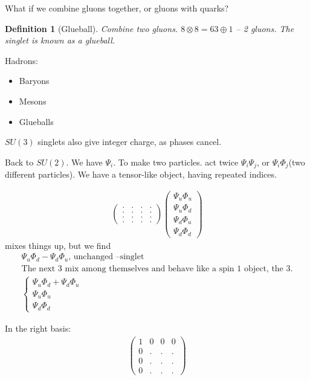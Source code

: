 \documentclass[]{article}
\newtheorem{defn}[thm]{Definition}
\begin{document}
What if we combine gluons together, or gluons with quarks?



\begin{defn}[Glueball]
	Combine two gluons. $8 \otimes 8 = 63 \oplus 1$ -- 2 gluons. The singlet is known as a glueball.
\end{defn}

Hadrons:
\begin{itemize}
	\item Baryons
	\item Mesons
	\item Glueballs
\end{itemize}

$SU(3)$ singlets also give integer charge, as phases cancel.

Back to $SU(2)$. We have $\Psi_i$. To make two particles. act twice $\Psi_i\Psi_j$, or $\Psi_i\Phi_j$(two different particles). We have a tensor-like object, having repeated indices.

\begin{align*}
	\begin{pmatrix}
		.&.&.&.\\
		.&.&.&.\\
		.&.&.&.\\
		.&.&.&.
	\end{pmatrix} 	\begin{pmatrix}
\Psi_u\Phi_u\\
\Psi_u\Phi_d\\
\Psi_d\Phi_u\\
\Psi_d\Phi_d
\end{pmatrix} 
\end{align*}
 mixes things up, but we find
\begin{align*}
    \Psi_u\Phi_d-\Psi_d\Phi_u \text{, unchanged --singlet}	\\
    \text{The next 3 mix among themselves and behave like a spin 1 object, the 3.}\\
	\begin{cases}
		 \Psi_u\Phi_d+\Psi_d\Phi_u\\
		\Psi_u\Phi_u\\
		\Psi_d\Phi_d
	\end{cases}
\end{align*}

In the right basis:
\begin{align*}
	\begin{pmatrix}
		1&0&0&0\\
		0&.&.&.\\
		0&.&.&.\\
		0&.&.&.
	\end{pmatrix}
\end{align*}
\end{document}
